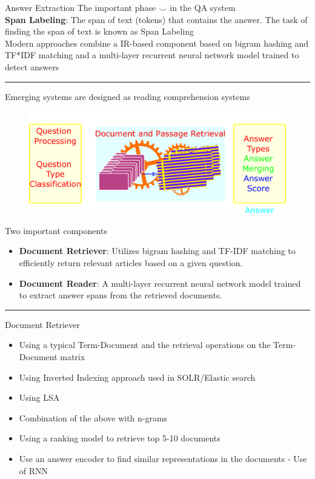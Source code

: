 \begin{frame}[shrink=15]{Answer Extraction}
The important phase $\smile$ in the QA system\\
\textbf{Span Labeling}: The span of text (tokens) that contains the answer. The task of finding the span of text is known as Span Labeling\\

Modern approaches combine a IR-based component   based   on   bigram   hashing and  TF*IDF  matching  and a  multi-layer recurrent neural network model trained to detect  answers \cite{hermann2015teaching} \cite{chen2017reading}
\rule{\linewidth}{0.1mm}
\begin{minipage}{0.4\linewidth}
Emerging systems are designed as reading comprehension systems
\begin{figure}
	\centering
	\includegraphics[width=0.9\linewidth]{./Images/AnswerProcessing}
	\label{fig:answerprocessing}
\end{figure}
\end{minipage}
\begin{minipage}{0.59\linewidth}
    Two important components
\begin{itemize}
    \item \textbf{Document Retriever}: Utilizes bigram hashing and TF-IDF matching to efficiently return relevant articles based on a given question.
    \item \textbf{Document Reader}: A multi-layer recurrent neural network model trained to extract answer spans from the retrieved documents.
\end{itemize}
\end{minipage}
\rule{\linewidth}{0.1mm}

\end{frame}

\begin{frame}{Document Retriever}
\begin{itemize}
	\item Using a typical Term-Document and the retrieval operations on the Term-Document matrix
	\item Using Inverted Indexing approach used in SOLR/Elastic search
	\item Using LSA
	\item Combination of the above with n-grams
	\item Using a ranking model to retrieve top 5-10 documents
	\item Use an answer encoder to find similar representations in the documents - Use of RNN
\end{itemize}
\end{frame}


